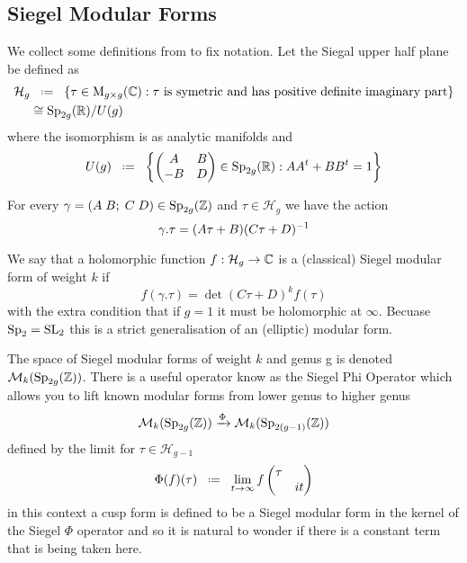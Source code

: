\subsection{Siegel Modular Forms}
We collect some definitions from \cite{bruinier123ModularForms2008} to fix notation. Let the Siegal upper half plane be defined as 
\begin{equation*}
    \begin{aligned}
        \mathcal{H}_g &\defeq \{\tau \in \mathrm{M}_{g\times g}(\C) : \tau \text{ is symetric and has positive definite imaginary part}\} \\
        & \cong \Sp_{2g}(\R) / U(g)
    \end{aligned}
\end{equation*}
where the isomorphism is as analytic manifolds  and 
\[U(g) \defeq \left\{\begin{pmatrix}
    A & B\\
    -B & D
\end{pmatrix}\in \Sp_{2g}(\R) : AA^t + BB^t = 1\right\}\]

For every \(\gamma= (A \; B; \; C\; D) \in \Sp_{2g}(\Z)\) and \(\tau \in \mathcal{H}_g\) we have the action
\[\gamma.\tau = (A\tau + B)(C\tau + D)^{-1} \]

We say that a holomorphic function \(f: \mathcal{H}_g \to \C\) is a (classical) Siegel modular form of weight \(k\) if 
\[f(\gamma.\tau) = \det(C\tau + D)^kf(\tau)\]
with the extra condition that if \(g = 1\) it must be holomorphic at \(\infty\). Becuase \(\operatorname{Sp}_2 = \operatorname{SL}_2\) this is a strict generalisation of an (elliptic) modular form.

The space of Siegel modular forms of weight \(k\) and genus g is denoted \(\mathcal{M}_k(\Sp_{2g}(\Z))\). There is a useful operator know as the Siegel Phi Operator which allows you to lift known modular forms from lower genus to higher genus \cite[5]{bruinier123ModularForms2008}
\[\mathcal{M}_k(\Sp_{2g}(\Z)) \xrightarrow{\Phi} \mathcal{M}_{k}(\Sp_{2(g-1)}(\Z))\]
defined by the limit for \(\tau\in \mathcal{H}_{g-1}\)
\[\Phi(f)(\tau) \defeq \lim_{t\to \infty} f\begin{pmatrix}
    \tau & \\
    & it 
\end{pmatrix}\]
in this context a cusp form is defined to be a Siegel modular form in the kernel of the Siegel \(\Phi\) operator and so it is natural to wonder if there is a constant term that is being taken here. 

